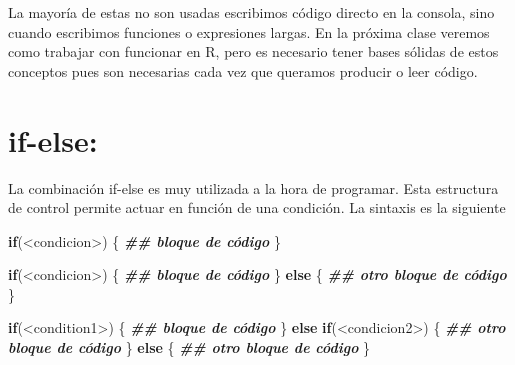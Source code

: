 \documentclass[
  12pt,
]{book}
\newenvironment{Shaded}{\begin{snugshade}}{\end{snugshade}}
\newcommand{\ControlFlowTok}[1]{\textcolor[rgb]{0.13,0.29,0.53}{\textbf{#1}}}
\newcommand{\DocumentationTok}[1]{\textcolor[rgb]{0.56,0.35,0.01}{\textbf{\textit{#1}}}}
\newcommand{\NormalTok}[1]{#1}
\newcommand{\SpecialCharTok}[1]{\textcolor[rgb]{0.00,0.00,0.00}{#1}}
\begin{document}
La mayoría de estas no son usadas escribimos código directo en la consola, sino cuando escribimos funciones o expresiones largas. En la próxima clase veremos como trabajar con funcionar en R, pero es necesario tener bases sólidas de estos conceptos pues son necesarias cada vez que queramos producir o leer código.

\hypertarget{if-else}{%
\section{\texorpdfstring{\textbf{if-else}:}{if-else:}}\label{if-else}}

La combinación if-else es muy utilizada a la hora de programar. Esta estructura de control permite actuar en función de una condición.
La sintaxis es la siguiente

\begin{Shaded}
\begin{Highlighting}[]
\ControlFlowTok{if}\NormalTok{(}\SpecialCharTok{\textless{}}\NormalTok{condicion}\SpecialCharTok{\textgreater{}}\NormalTok{) \{}
  \DocumentationTok{\#\# bloque de código}
\NormalTok{\}}
\end{Highlighting}
\end{Shaded}

\begin{Shaded}
\begin{Highlighting}[]
\ControlFlowTok{if}\NormalTok{(}\SpecialCharTok{\textless{}}\NormalTok{condicion}\SpecialCharTok{\textgreater{}}\NormalTok{) \{}
  \DocumentationTok{\#\# bloque de código}
\NormalTok{\} }\ControlFlowTok{else}\NormalTok{ \{}
  \DocumentationTok{\#\# otro bloque de código}
\NormalTok{\}}
\end{Highlighting}
\end{Shaded}

\begin{Shaded}
\begin{Highlighting}[]
\ControlFlowTok{if}\NormalTok{(}\SpecialCharTok{\textless{}}\NormalTok{condition1}\SpecialCharTok{\textgreater{}}\NormalTok{) \{}
  \DocumentationTok{\#\# bloque de código}
\NormalTok{\} }\ControlFlowTok{else} \ControlFlowTok{if}\NormalTok{(}\SpecialCharTok{\textless{}}\NormalTok{condicion2}\SpecialCharTok{\textgreater{}}\NormalTok{) \{}
  \DocumentationTok{\#\# otro bloque de código}
\NormalTok{\} }\ControlFlowTok{else}\NormalTok{ \{}
  \DocumentationTok{\#\# otro bloque de código}
\NormalTok{\}}
\end{Highlighting}
\end{Shaded}
\end{document}

